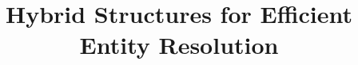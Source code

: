 \documentclass{vldb}
\title{Hybrid Structures for Efficient Entity Resolution}
\author{\alignauthor{Christan Earl Grant}\\
    \affaddr{University of Florida}\\
    \affaddr{Dept.\ of Computer Science}\\
    \affaddr{Gainesville, Florida, USA} \\
    \email{cgrant@cise.ufl.edu}\\

\alignauthor{Daisy Zhe Wang}\\
    \affaddr{University of Florida}\\
    \affaddr{Dept.\ of Computer Science}\\
    \affaddr{Gainesville, Florida, USA}\\
    \email{daisyw@cise.ufl.edu}\\
}
\begin{document}
\maketitle



















{%
  \scriptsize%
  
  
}
\end{document}
